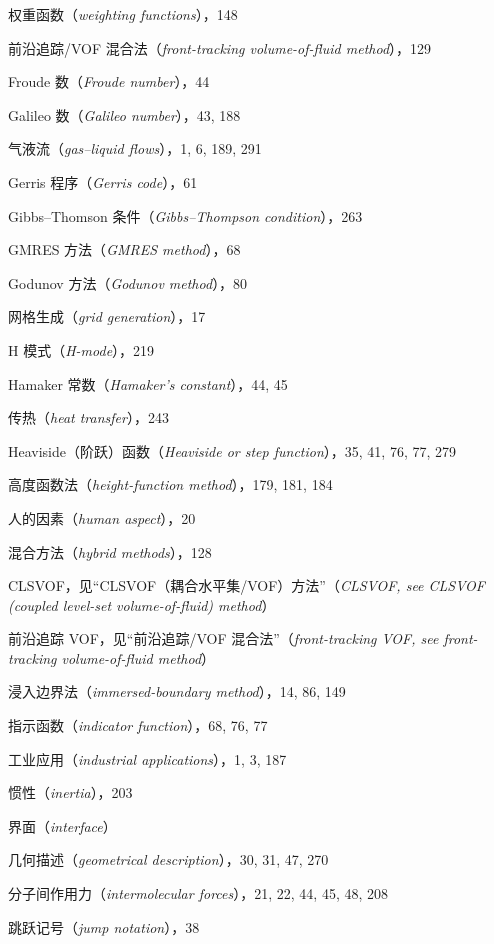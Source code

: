 \documentclass[11pt,a4paper,openany,fontset=none]{ctexbook}
\begin{document}
\quad 权重函数（\textit{weighting functions}），148\par
前沿追踪/VOF 混合法（\textit{front-tracking volume-of-fluid method}），129\par
Froude 数（\textit{Froude number}），44\par
Galileo 数（\textit{Galileo number}），43, 188\par
气液流（\textit{gas–liquid flows}），1, 6, 189, 291\par
Gerris 程序（\textit{Gerris code}），61\par
Gibbs--Thomson 条件（\textit{Gibbs–Thompson condition}），263\par
GMRES 方法（\textit{GMRES method}），68\par
Godunov 方法（\textit{Godunov method}），80\par
网格生成（\textit{grid generation}），17\par
H 模式（\textit{H-mode}），219\par
Hamaker 常数（\textit{Hamaker’s constant}），44, 45\par
传热（\textit{heat transfer}），243\par
Heaviside（阶跃）函数（\textit{Heaviside or step function}），35, 41, 76, 77, 279\par
高度函数法（\textit{height-function method}），179, 181, 184\par
人的因素（\textit{human aspect}），20\par
混合方法（\textit{hybrid methods}），128\par
\quad CLSVOF，见“CLSVOF（耦合水平集/VOF）方法”（\textit{CLSVOF, see CLSVOF (coupled level-set volume-of-fluid) method}）\par
\quad 前沿追踪 VOF，见“前沿追踪/VOF 混合法”（\textit{front-tracking VOF, see front-tracking volume-of-fluid method}）\par
浸入边界法（\textit{immersed-boundary method}），14, 86, 149\par
指示函数（\textit{indicator function}），68, 76, 77\par
工业应用（\textit{industrial applications}），1, 3, 187\par
惯性（\textit{inertia}），203\par
界面（\textit{interface}）\par
\quad 几何描述（\textit{geometrical description}），30, 31, 47, 270\par
分子间作用力（\textit{intermolecular forces}），21, 22, 44, 45, 48, 208\par
跳跃记号（\textit{jump notation}），38\par
\end{document}
